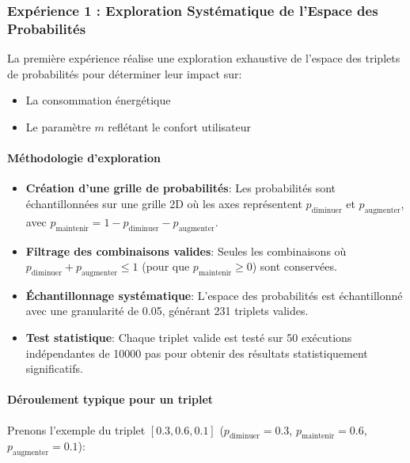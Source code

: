 \documentclass[a4paper,11pt]{article}
\begin{document}
\subsubsection{Expérience 1 : Exploration Systématique de l'Espace des Probabilités}

La première expérience réalise une exploration exhaustive de l'espace des triplets de probabilités pour déterminer leur impact sur:
\begin{itemize}
    \item La consommation énergétique
    \item Le paramètre $m$ reflétant le confort utilisateur
\end{itemize}

\paragraph{Méthodologie d'exploration}
\begin{itemize}
    \item \textbf{Création d'une grille de probabilités}: 
    Les probabilités sont échantillonnées sur une grille 2D où les axes représentent $p_{\text{diminuer}}$ et $p_{\text{augmenter}}$, avec $p_{\text{maintenir}} = 1 - p_{\text{diminuer}} - p_{\text{augmenter}}$.
    
    \item \textbf{Filtrage des combinaisons valides}: 
    Seules les combinaisons où $p_{\text{diminuer}} + p_{\text{augmenter}} \leq 1$ (pour que $p_{\text{maintenir}} \geq 0$) sont conservées.
    
    \item \textbf{Échantillonnage systématique}: 
    L'espace des probabilités est échantillonné avec une granularité de 0.05, générant 231 triplets valides.
    
    \item \textbf{Test statistique}: 
    Chaque triplet valide est testé sur 50 exécutions indépendantes de 10000 pas pour obtenir des résultats statistiquement significatifs.
\end{itemize}

\paragraph{Déroulement typique pour un triplet}
Prenons l'exemple du triplet $[0.3, 0.6, 0.1]$ ($p_{\text{diminuer}}=0.3$, $p_{\text{maintenir}}=0.6$, $p_{\text{augmenter}}=0.1$):
\end{document}
